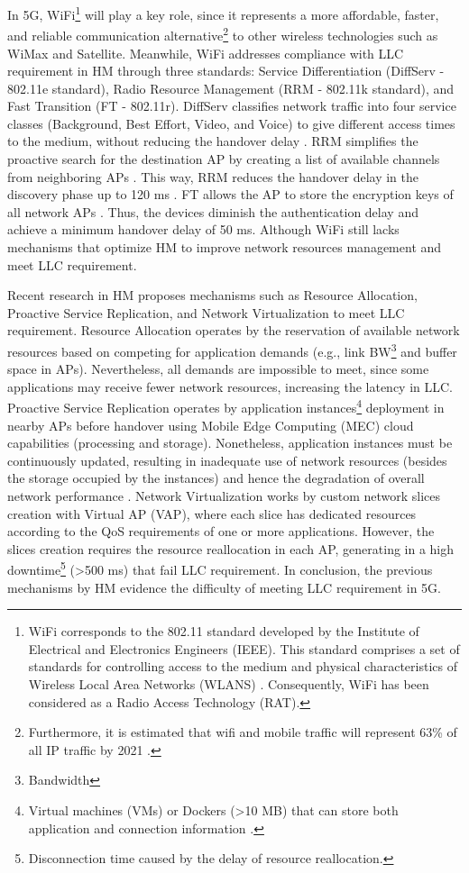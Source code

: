 In 5G, WiFi\footnote{WiFi corresponds to the 802.11 standard developed by the Institute of Electrical and Electronics Engineers (IEEE). This standard comprises a set of standards for controlling access to the medium and physical characteristics of Wireless Local Area Networks (WLANS) \cite{607}. Consequently, WiFi has been considered as a Radio Access Technology (RAT).} will play a key role, since it represents a more affordable, faster, and reliable communication alternative\footnote{Furthermore, it is estimated that wifi and mobile traffic will represent 63\% of all IP traffic by 2021 \cite{240}.} to other wireless technologies such as WiMax and Satellite. Meanwhile, WiFi addresses compliance with LLC requirement in HM through three standards: Service Differentiation (DiffServ - 802.11e standard), Radio Resource Management (RRM - 802.11k standard), and Fast Transition (FT - 802.11r). DiffServ classifies network traffic into four service classes (Background, Best Effort, Video, and Voice) to give different access times to the medium, without reducing the handover delay \cite{329,31}. RRM simplifies the proactive search for the destination AP by creating a list of available channels from neighboring APs \cite{113}. This way, RRM reduces the handover delay in the discovery phase up to 120 ms \cite{403}. FT allows the AP to store the encryption keys of all network APs \cite{16}. Thus, the devices diminish the authentication delay and achieve a minimum handover delay of 50 ms. Although WiFi still lacks mechanisms that optimize HM to improve network resources management and meet LLC requirement.


Recent research in HM proposes mechanisms such as Resource Allocation, Proactive Service Replication, and Network Virtualization to meet LLC requirement. Resource Allocation \cite{209-27, 125, 127, a131} operates by the reservation of available network resources based on competing for application demands (e.g., link BW\footnote{Bandwidth} and buffer space in APs). Nevertheless, all demands are impossible to meet, since some applications may receive fewer network resources, increasing the latency in LLC. Proactive Service Replication \cite{205,201,217,903} operates by application instances\footnote{Virtual machines (VMs) or Dockers (\textgreater 10 MB) that can store both application and connection information \cite{205}.} deployment in nearby APs before handover using Mobile Edge Computing (MEC) cloud capabilities (processing and storage). Nonetheless, application instances must be continuously updated, resulting in inadequate use of network resources (besides the storage occupied by the instances) and hence the degradation of overall network performance \cite{205,201}. Network Virtualization \cite{101,209,26,103,327} works by custom network slices creation with Virtual AP (VAP), where each slice has dedicated resources according to the QoS requirements of one or more applications. However, the slices creation requires the resource reallocation in each AP, generating in a high downtime\footnote{Disconnection time caused by the delay of resource reallocation.} (\textgreater 500 ms) that fail LLC requirement. In conclusion, the previous mechanisms by HM evidence the difficulty of meeting LLC requirement in 5G.

